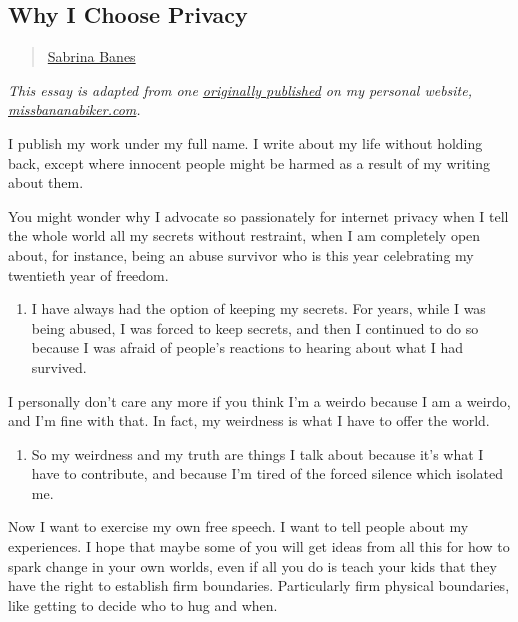 \subsection{Why I Choose Privacy}\label{why-i-choose-privacy}

\begin{quote}
\href{../appendix/attributions.html\#sabrina-banes}{Sabrina Banes}
\end{quote}

\emph{This essay is adapted from one
\href{http://www.missbananabiker.com/2015/10/28/the-option-of-privacy/}{originally
published} on my personal website,
\href{http://missbananabiker.com}{missbananabiker.com}.}

I publish my work under my full name. I write about my life without
holding back, except where innocent people might be harmed as a result
of my writing about them.

You might wonder why I advocate so passionately for internet privacy
when I tell the whole world all my secrets without restraint, when I am
completely open about, for instance, being an abuse survivor who is this
year celebrating my twentieth year of freedom.

\begin{enumerate}
\def\labelenumi{\arabic{enumi}.}
\tightlist
\item
  I have always had the option of keeping my secrets. For years, while I
  was being abused, I was forced to keep secrets, and then I continued
  to do so because I was afraid of people's reactions to hearing about
  what I had survived.
\end{enumerate}

I personally don't care any more if you think I'm a weirdo because I am
a weirdo, and I'm fine with that. In fact, my weirdness is what I have
to offer the world.

\begin{enumerate}
\def\labelenumi{\arabic{enumi}.}
\setcounter{enumi}{1}
\tightlist
\item
  So my weirdness and my truth are things I talk about because it's what
  I have to contribute, and because I'm tired of the forced silence
  which isolated me.
\end{enumerate}

Now I want to exercise my own free speech. I want to tell people about
my experiences. I hope that maybe some of you will get ideas from all
this for how to spark change in your own worlds, even if all you do is
teach your kids that they have the right to establish firm boundaries.
Particularly firm physical boundaries, like getting to decide who to hug
and when.

